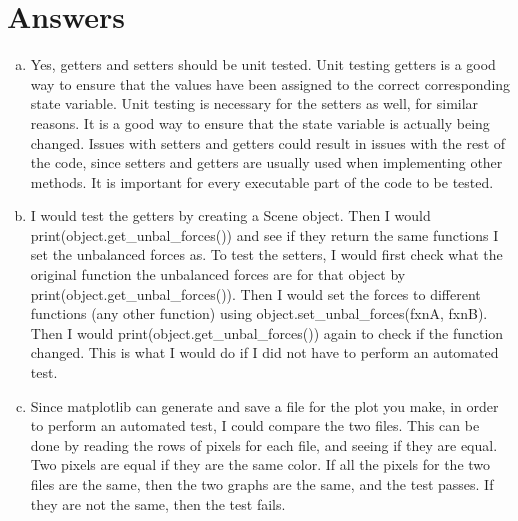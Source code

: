 \documentclass[12pt]{article}
\begin{document}
\section{Answers}

\begin{enumerate}[a)]

\item Yes, getters and setters should be unit tested. Unit testing getters is a good way to ensure that the values have been assigned to the correct corresponding state variable. Unit testing is necessary for the setters as well, for similar reasons. It is a good way to ensure that the state variable is actually being changed. Issues with setters and getters could result in issues with the rest of the code, since setters and getters are usually used when implementing other methods. It is important for every executable part of the code to be tested.

\item I would test the getters by creating a Scene object. Then I would print(object.get\_unbal\_forces()) and see if they return the same functions I set the unbalanced forces as. To test the setters, I would first check what the original function the unbalanced forces are for that object by print(object.get\_unbal\_forces()). Then I would set the forces to different functions (any other function) using object.set\_unbal\_forces(fxnA, fxnB). Then I would print(object.get\_unbal\_forces()) again to check if the function changed. This is what I would do if I did not have to perform an automated test.

\item Since matplotlib can generate and save a file for the plot you make, in order to perform an automated test, I could compare the two files. This can be done by reading the rows of pixels for each file, and seeing if they are equal. Two pixels are equal if they are the same color. If all the pixels for the two files are the same, then the two graphs are the same, and the test passes. If they are not the same, then the test fails.


\end{enumerate}
\end{document}
